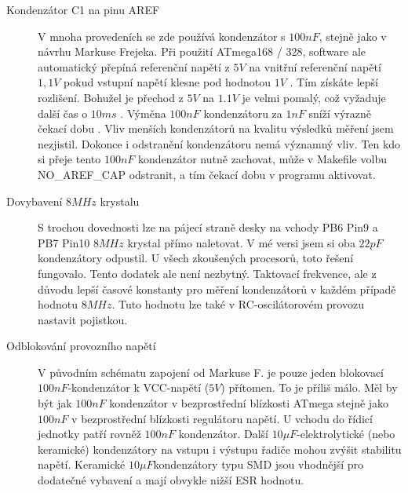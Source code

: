 \begin{description}
\vspace{-0.3cm}
\item[Kondenzátor C1 na pinu AREF]
V mnoha provedeních se zde používá kondenzátor s \(100nF\), stejně jako v návrhu Markuse Frejeka.
Při použití ATmega168 / 328, software ale automatický přepíná referenční napětí z  \(5V\) na vnitřní
referenční napětí \(1,1V\) pokud vstupní napětí klesne pod hodnotou \(1V\) .
Tím získáte lepší rozlišení.
Bohužel je přechod z \(5V\) na \(1.1V\) je velmi pomalý, což vyžaduje další čas o \(10ms\) .
Výměna  \(100nF\) kondenzátoru za \(1nF\) sníží výrazně čekací dobu  . Vliv menších kondenzátorů
na kvalitu výsledků měření jsem nezjistil. Dokonce i odstranění kondenzátoru nemá významný vliv.
Ten kdo si přeje tento \(100nF\) kondenzátor nutně zachovat, může v Makefile volbu NO\_AREF\_CAP odstranit,
 a tím čekací dobu v programu aktivovat.
\vspace{-0.3cm}
\item[Dovybavení \(8MHz\) krystalu] S trochou dovednosti lze na pájecí straně desky na vchody PB6 Pin9 a PB7 Pin10  \(8MHz\) krystal přímo naletovat. V mé versi jsem si oba \(22pF\) kondenzátory odpustil. U všech zkoušených procesorů, toto řešení fungovalo. Tento dodatek ale není nezbytný.
Taktovací frekvence, ale z důvodu lepší časové konstanty pro měření kondenzátorů v každém případě
hodnotu \(8MHz\). Tuto hodnotu lze také v RC-oscilátorovém provozu nastavit pojistkou.
\vspace*{-0,8cm}
\item[Odblokování provozního napětí]
V původním schématu zapojení od Markuse F. je pouze jeden blokovací \(100nF\)-kondenzátor
k VCC-napětí (\(5V\)) přítomen. To je příliš málo. Měl by být jak \(100nF\) kondenzátor v bezprostřední
blízkosti ATmega stejně jako \(100nF\) v bezprostřední blízkosti regulátoru napětí. U vchodu do 
řídicí jednotky patří rovněž  \(100nF\) kondenzátor. Další  \(10\mu F\)-elektrolytické (nebo keramické)
kondenzátory na vstupu i výstupu řadiče mohou zvýšit stabilitu napětí.
Keramické \(10\mu F\)kondenzátory typu SMD jsou vhodnější pro dodatečné vybavení a mají
obvykle nižší ESR hodnotu.


\end{description}
